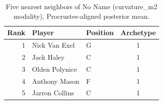 \begin{table}[htbp]
  \centering\small
  \begin{tabular}{rllc}
    \toprule
    Rank & Player & Position & Archetype \\
    \midrule
    1 & Nick Van Exel & G & 1 \\
    2 & Jack Haley & C & 1 \\
    3 & Olden Polynice & C & 1 \\
    4 & Anthony Mason & F & 1 \\
    5 & Jarron Collins & C & 1 \\
    \bottomrule
  \end{tabular}
  \caption{Five nearest neighbors of No Name (curvature_m2 modality), Procrustes-aligned posterior mean.}
  \label{tab:No_Name_neighbors_curvature_m2}
\end{table}

